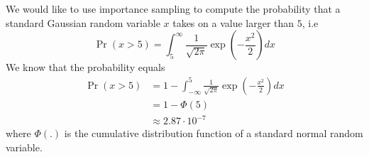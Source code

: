 
\label{ex:importance-sampling-to-estimate-tail-probabilities}
We would like to use importance sampling to compute the probability
that a standard Gaussian random variable $x$ takes on a value larger
than $5$, i.e
\begin{equation}
  \Pr(x>5) = \int_{5}^\infty \frac{1}{\sqrt{2\pi}} \exp\left(-\frac{x^2}{2}\right) dx
\end{equation}
We know that the probability equals
\begin{align}
  \Pr(x>5) & = 1-\int_{-\infty}^5 \frac{1}{\sqrt{2\pi}} \exp\left(-\frac{x^2}{2}\right) dx\\
  & = 1-\Phi(5)\\
  & \approx 2.87 \cdot 10^{-7}
\end{align}
where $\Phi(.)$ is the cumulative distribution function of a standard
normal random variable.

